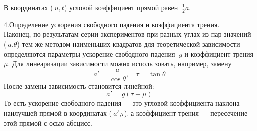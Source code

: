 \documentclass[a4paper, 12pt]{article}
\begin{document}
В координатах 
(\(\ u,t\)) угловой коэффициент прямой равен 
\(\ \frac{1}{2}a\).

4.Определение ускорения свободного падения и коэффициента трения.\\
Наконец, по результатам серии экспериментов при разных углах из пар 
значений ({\(\ a\),\(\theta\)}) тем же методом наименьших квадратов для теоретической 
зависимости  определяются параметры ускорение свободного падения \(\ g\) 
и коэффициент трения \(\mu\). Для линеаризации зависимости  можно исполь
зовать, например, замену
\[
a' = \frac{a}{\cos\theta}, \quad \tau = \tan\theta
\]
После замены зависимость становится линейной:
\[
a' = g (\tau - \mu)
\]
То есть ускорение свободного падения — это угловой коэффициента 
наклона наилучшей прямой в координатах (\(\ a'\),\(\tau\)), а коэффициент трения — 
пересечение этой прямой с осью абсцисс. 
\end{document}
